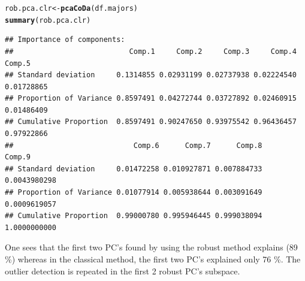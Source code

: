 \documentclass[a4paper,oneside,12pt,titlepage]{article}\usepackage[]{graphicx}\usepackage[]{color}
\makeatletter
\newcommand{\hlstd}[1]{\textcolor[rgb]{0.345,0.345,0.345}{#1}}%
\newcommand{\hlkwb}[1]{\textcolor[rgb]{0.69,0.353,0.396}{#1}}%
\newcommand{\hlkwd}[1]{\textcolor[rgb]{0.737,0.353,0.396}{\textbf{#1}}}%
\newenvironment{kframe}{%
 \def\at@end@of@kframe{}%
 \ifinner\ifhmode%
  \def\at@end@of@kframe{\end{minipage}}%
  \begin{minipage}{\columnwidth}%
 \fi\fi%
 \def\FrameCommand##1{\hskip\@totalleftmargin \hskip-\fboxsep
 \colorbox{shadecolor}{##1}\hskip-\fboxsep
     \hskip-\linewidth \hskip-\@totalleftmargin \hskip\columnwidth}%
 \MakeFramed {\advance\hsize-\width
   \@totalleftmargin\z@ \linewidth\hsize
   \@setminipage}}%
 {\par\unskip\endMakeFramed%
 \at@end@of@kframe}
\newenvironment{knitrout}{}{} %
\makeatother
\begin{document}
\begin{knitrout}
\color{fgcolor}\begin{kframe}
\begin{alltt}
\hlstd{rob.pca.clr} \hlkwb{<-} \hlkwd{pcaCoDa}\hlstd{(df.majors)}
\hlkwd{summary}\hlstd{(rob.pca.clr)}
\end{alltt}
\begin{verbatim}
## Importance of components:
##                           Comp.1     Comp.2     Comp.3     Comp.4     Comp.5
## Standard deviation     0.1314855 0.02931199 0.02737938 0.02224540 0.01728865
## Proportion of Variance 0.8597491 0.04272744 0.03727892 0.02460915 0.01486409
## Cumulative Proportion  0.8597491 0.90247650 0.93975542 0.96436457 0.97922866
##                            Comp.6      Comp.7      Comp.8       Comp.9
## Standard deviation     0.01472258 0.010927871 0.007884733 0.0043980298
## Proportion of Variance 0.01077914 0.005938644 0.003091649 0.0009619057
## Cumulative Proportion  0.99000780 0.995946445 0.999038094 1.0000000000
\end{verbatim}
\end{kframe}
\end{knitrout}
One sees that the first two PC's found by using the robust method explains (89 \%) whereas in the classical method, the first two PC's explained only 76 \%. The outlier detection is repeated in the first 2 robust PC's subspace.
\end{document}
